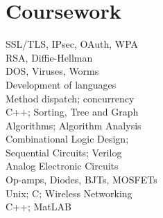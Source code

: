 \documentclass[]{resume}
\begin{document}
\begin{minipage}[t]{0.33\textwidth}
\section{Coursework}
\hspace{8pt} SSL/TLS, IPsec, OAuth, WPA \\
\hspace{8pt} RSA, Diffie-Hellman \\
\hspace{8pt} DOS, Viruses, Worms \\
\vspace{4pt}
\hspace{8pt} Development of languages \\
\hspace{8pt} Method dispatch; concurrency \\
\vspace{4pt}
\hspace{8pt} C++; Sorting, Tree and Graph \\
\hspace{8pt} Algorithms; Algorithm Analysis\\
\vspace{4pt}
\hspace{8pt} Combinational Logic Design; \\
\hspace{8pt} Sequential Circuits; Verilog \\
\vspace{4pt}
\hspace{8pt} Analog Electronic Circuits \\
\hspace{8pt} Op-amps, Diodes, BJTs, MOSFETs \\
\vspace{4pt}
\hspace{8pt} Unix; C; Wireless Networking \\
\vspace{4pt}
\hspace{8pt} C++; MatLAB \\
\vspace{4pt}
\sectionsep



\end{minipage}
\end{document}
